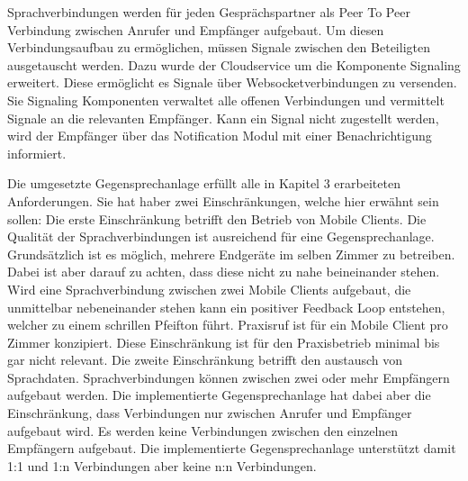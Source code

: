 Sprachverbindungen werden für jeden Gesprächspartner als Peer To Peer Verbindung zwischen Anrufer und Empfänger aufgebaut.
Um diesen Verbindungsaufbau zu ermöglichen, müssen Signale zwischen den Beteiligten ausgetauscht werden.
Dazu wurde der Cloudservice um die Komponente Signaling erweitert.
Diese ermöglicht es Signale über Websocketverbindungen zu versenden.
Sie Signaling Komponenten verwaltet alle offenen Verbindungen und vermittelt Signale an die relevanten Empfänger.
Kann ein Signal nicht zugestellt werden, wird der Empfänger über das Notification Modul mit einer Benachrichtigung informiert.

Die umgesetzte Gegensprechanlage erfüllt alle in Kapitel 3 erarbeiteten Anforderungen.
Sie hat haber zwei Einschränkungen, welche hier erwähnt sein sollen:
Die erste Einschränkung betrifft den Betrieb von Mobile Clients.
Die Qualität der Sprachverbindungen ist ausreichend für eine Gegensprechanlage.
Grundsätzlich ist es möglich, mehrere Endgeräte im selben Zimmer zu betreiben.
Dabei ist aber darauf zu achten, dass diese nicht zu nahe beineinander stehen.
Wird eine Sprachverbindung zwischen zwei Mobile Clients aufgebaut, die unmittelbar nebeneinander stehen kann ein positiver Feedback Loop entstehen, welcher zu einem schrillen Pfeifton führt.
Praxisruf ist für ein Mobile Client pro Zimmer konzipiert.
Diese Einschränkung ist für den Praxisbetrieb minimal bis gar nicht relevant.
Die zweite Einschränkung betrifft den austausch von Sprachdaten.
Sprachverbindungen können zwischen zwei oder mehr Empfängern aufgebaut werden.
Die implementierte Gegensprechanlage hat dabei aber die Einschränkung, dass Verbindungen nur zwischen Anrufer und Empfänger aufgebaut wird.
Es werden keine Verbindungen zwischen den einzelnen Empfängern aufgebaut.
Die implementierte Gegensprechanlage unterstützt damit 1:1 und 1:n Verbindungen aber keine n:n Verbindungen.
